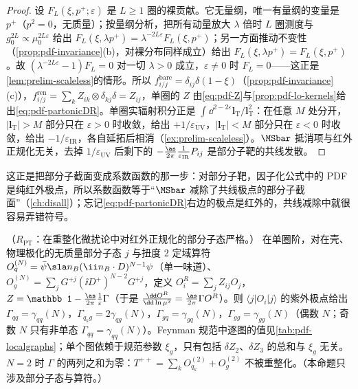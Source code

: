 \begin{proof}
设 $F_L(\xi,p^+;\varepsilon)$ 是 $L\ge1$ 圈的裸贡献。它无量纲，唯一有量纲的变量是 $p^+$（$p^2=0$，无质量）；按量纲分析，把所有动量放大 $\lambda$ 倍时 $L$ 圈测度与 $g_0^{2L}\propto\mu_0^{2L\varepsilon}$ 给出 $F_L(\xi,\lambda p^+)=\lambda^{-2L\varepsilon}F_L(\xi,p^+)$；另一方面推动不变性（\cref{prop:pdf-invariance}(b)，对裸分布同样成立）给出 $F_L(\xi,\lambda p^+)=F_L(\xi,p^+)$。故 $(\lambda^{-2L\varepsilon}-1)F_L=0$ 对一切 $\lambda>0$ 成立，$\varepsilon\ne0$ 时 $F_L=0$——这正是\cref{lem:prelim-scaleless}的情形。所以 $f^{\mathrm{bare}}_{i/j}=\delta_{ij}\delta(1-\xi)$（\cref{prop:pdf-invariance}(c)），$f^{\mathrm{ren}}_{i/j}=\sum_kZ_{ik}\otimes\delta_{kj}\delta=Z_{ij}$，单圈的 $Z$ 由\cref{eq:pdf-Z}与\cref{prop:pdf-lo-kernels}给出\cref{eq:pdf-partonicDR}。单圈实辐射积分正是 $\int\dd^{2-2\varepsilon}\bm l_{\mathrm T}/\bm l_{\mathrm T}^2$：在任意 $M$ 处分开，$|\bm l_{\mathrm T}|>M$ 部分只在 $\varepsilon>0$ 时收敛，给出 $+1/\varepsilon_{\mathrm{UV}}$，$|\bm l_{\mathrm T}|<M$ 部分只在 $\varepsilon<0$ 时收敛，给出 $-1/\varepsilon_{\mathrm{IR}}$，各自延拓后相消（\cref{ex:prelim-scaleless}）。$\MSbar$ 抵消项与红外正规化无关，去掉 $1/\varepsilon_{\mathrm{UV}}$ 后剩下的 $-\frac{\as}{2\pi}\frac1{\varepsilon_{\mathrm{IR}}}P_{ij}$ 是部分子靶的共线发散。
\end{proof}

这正是把部分子截面变成系数函数的那一步：对部分子靶，因子化公式中的 PDF 是纯红外极点，所以系数函数等于“$\MSbar$ 减除了共线极点的部分子截面”（\cref{ch:disall}）；忘记\cref{eq:pdf-partonicDR}右边的极点是红外的，共线减除中就很容易弄错符号。

\begin{proposition}\label{prop:pdf-local-anomalous}
（$R_{\mathrm{PT}}$：在重整化微扰论中对红外正规化的部分子态严格。）
在单圈阶，对在壳、物理极化的无质量部分子态 $j$ 与扭度 2 定域算符 $O_q^{(N)}=\bar\psi\sla n_B(\ii n_B\cdot D)^{N-1}\psi$（单一味道）、$O_g^{(N)}=\sum_jG^{+j}(\ii D^+)^{N-2}G^{+j}$，定义 $O_i^R=\sum_jZ_{ij}O_j$，$Z=\mathbb 1-\frac{\as}{2\pi}\frac1\varepsilon\Gamma$（于是 $\frac{\dd O^R}{\dd\ln\mu^2}=\frac{\as}{2\pi}\Gamma O^R$）。则 $\langle j|O_i|j\rangle$ 的紫外极点给出 $\Gamma_{qq}=\gamma_{qq}(N)$，$\Gamma_{q_kg}=2\gamma_{qg}(N)$，$\Gamma_{gq}=\gamma_{gq}(N)$，$\Gamma_{gg}=\gamma_{gg}(N)$（偶数 $N$；奇数 $N$ 只有非单态 $\Gamma_{qq}=\gamma_{qq}(N)$）。Feynman 规范中逐图的值见\cref{tab:pdf-localgraphs}；单个图依赖于规范参数 $\xi_g$，只有包括 $\delta Z_2$、$\delta Z_3$ 的总和与 $\xi_g$ 无关。$N=2$ 时 $\Gamma$ 的两列之和为零：$T^{++}=\sum_kO^{(2)}_{q_k}+O^{(2)}_g$ 不被重整化。（本命题只涉及部分子态与算符。）
\end{proposition}

